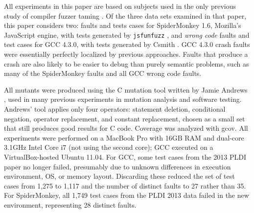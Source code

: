



All experiments in this paper are based on subjects used in the only previous study of compiler fuzzer taming \cite{PLDI13}.  Of the three data sets examined in that paper, this paper considers two:  faults and tests cases for SpiderMonkey 1.6, Mozilla's JavaScript engine, with tests generated by {\tt jsfunfuzz} \cite{jsfunfuzz}, and \emph{wrong code} faults and test cases for GCC 4.3.0, with tests generated by Csmith \cite{csmith}.  GCC 4.3.0 crash faults were essentially perfectly localized by previous approaches.  Faults that produce a crash are also likely to be easier to debug than purely semantic problems, such as many of the SpiderMonkey faults and all GCC wrong code faults.

All mutants were produced using the C mutation tool written by Jamie Andrews \cite{mutant}, used in many previous experiments in mutation analysis and software testing.  Andrews' tool applies only four operators: statement deletion, conditional negation, operator replacement, and constant replacement, chosen as a small set that still produces good results for C code.  Coverage was analyzed with gcov.   All experiments were performed on a MacBook Pro with 16GB RAM and dual-core 3.1GHz Intel Core i7 (not using the second core); GCC executed on a VirtualBox-hosted Ubuntu 11.04.  For GCC, some test cases from the 2013 PLDI paper no longer failed, presumably due to unknown differences in execution environment, OS, or memory layout. Discarding these reduced the set of test cases from 1,275 to 1,117 and the number of distinct faults to 27 rather than 35.  For SpiderMonkey, all 1,749 test cases from the PLDI 2013 data failed in the new environment, representing 28 distinct faults.

